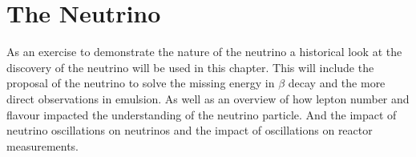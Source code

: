 

\ifpdf
    \graphicspath{{Chapter2/Figs/Raster/}{Chapter2/Figs/PDF/}{Chapter2/Figs/}}
\else
    \graphicspath{{Chapter2/Figs/Vector/}{Chapter2/Figs/}}
\fi

\chapter{The Neutrino}\label{Chp:ABfriefHistoryOfNeutrinos} 
As an exercise to demonstrate the nature of the neutrino a historical look at the discovery of the neutrino will be used in this chapter. This will include the proposal of the neutrino to solve the missing energy in $\beta$ decay and the more direct observations in emulsion. As well as an overview of how lepton number and flavour impacted the understanding of the neutrino particle. And the impact of neutrino oscillations on neutrinos and the impact of oscillations on reactor measurements. 

